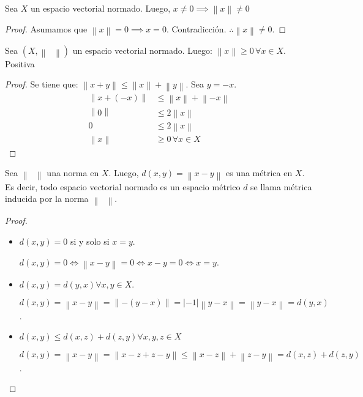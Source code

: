 \begin{proposition*}
    Sea $X$ un espacio vectorial normado.
    Luego, $x\neq0\implies\left\|x\right\|\neq0$
\end{proposition*}

\begin{proof}
    Asumamos que $\left\|x\right\|=0\implies x=0$.
    Contradicción.
    $\therefore\left\|x\right\|\neq 0$.
\end{proof}

\begin{proposition*}
    Sea $\left(X, \left\|\phantom{\cdot}\right\|\right)$ un espacio vectorial normado. Luego: $\left\|x\right\|\geq0\,\forall x\in X$. Positiva
\end{proposition*}

\begin{proof}
    Se tiene que:
    \begin{math}
        \left\|x+y\right\|\leq
        \left\|x\right\|+
        \left\|y\right\|
    \end{math}.
    Sea $y=-x$.
    \begin{align*}
        \left\|x+\left(-x\right)\right\| & \leq
        \left\|x\right\|+\left\|-x\right\|                        \\
        \left\|0\right\|                 & \leq 2\left\|x\right\| \\
        0                                & \leq2\left\|x\right\|  \\
        \left\|x\right\|                 & \geq0\,\forall x\in X
    \end{align*}
\end{proof}

\begin{proposition*}
    Sea $\left\|\phantom{\cdot}\right\|$ una norma en $X$.
    Luego, $d\left(x,y\right)=\left\|x-y\right\|$ es una métrica en $X$.
    Es decir, todo espacio vectorial normado es un espacio métrico $d$ se llama métrica inducida por la norma $\left\|\phantom{\cdot}\right\|$.
\end{proposition*}

\begin{proof}\leavevmode
    \begin{itemize}
        \item $d\left(x,y\right)=0$ si y solo si $x=y$.

              $d\left(x,y\right)=0\iff \left\|x-y\right\|=0\iff x-y=0\iff x=y$.

        \item $d\left(x,y\right)=d\left(y,x\right)\forall x,y\in X$.

              $d\left(x,y\right)=\left\|x-y\right\|=\left\|-\left(y-x\right)\right\|=\left|-1\right|\left\|y-x\right\|=\left\|y-x\right\|=d\left(y,x\right)$.

        \item $d\left(x,y\right)\leq d\left(x,z\right)+d\left(z,y\right)\forall x,y,z\in X$

              $d\left(x,y\right)=\left\|x-y\right\|=\left\|x-z+z-y\right\|\leq \left\|x-z\right\|+\left\|z-y\right\|=d\left(x,z\right)+d\left(z,y\right)$.
    \end{itemize}
\end{proof}

